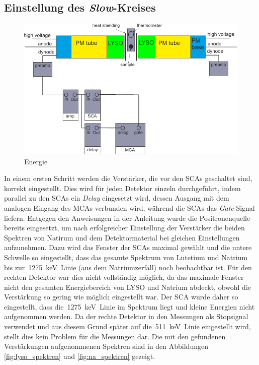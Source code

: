 \documentclass[11pt, a4paper]{article}
\numberwithin{equation}{section}
\begin{document}
\subsection{Einstellung des \textit{Slow}-Kreises}
\begin{figure}[h]
	\centering
	\includegraphics[width=1.0\textwidth]{./figures/aufbau/energie.pdf}
	\caption{Energie \cite{anleitung}}
\end{figure}
In einem ersten Schritt werden die Verstärker, die vor den SCAs geschaltet sind, korrekt eingestellt.
Dies wird für jeden Detektor einzeln durchgeführt, indem parallel zu den SCAs ein \textit{Delay} eingesetzt wird, dessen Ausgang mit dem analogen Eingang des MCAs verbunden wird, während die SCAs das \textit{Gate}-Signal liefern.
Entgegen den Anweisungen in der Anleitung wurde die Positronenquelle bereits eingesetzt, um nach erfolgreicher Einstellung der Verstärker die beiden Spektren von Natirum und dem Detektormaterial bei gleichen Einstellungen aufzunehmen.
Dazu wird das Fenster der SCAs maximal gewählt und die untere Schwelle so eingestellt, dass das gesamte Spektrum von Lutetium und Natrium bis zur~\SI{1275}{keV}~Linie (aus dem Natriumzerfall) noch beobachtbar ist.
Für den rechten Detektor war dies nicht vollständig möglich, da das maximale Fenster nicht den gesamten Energiebereich von LYSO und Natrium abdeckt, obwohl die Verstärkung so gering wie möglich eingestellt war.
Der SCA wurde daher so eingestellt, dass die~\SI{1275}{keV}~Linie im Spektrum liegt und kleine Energien nicht aufgenommen werden.
Da der rechte Detektor in den Messungen als Stopsignal verwendet und aus diesem Grund später auf die~\SI{511}{keV}~Linie eingestellt wird, stellt dies kein Problem für die Messungen dar.
Die mit den gefundenen Verstärkungen aufgenommenen Spektren sind in den Abbildungen \ref{fig:lyso_spektren} und \ref{fig:na_spektren} gezeigt.
\end{document}
